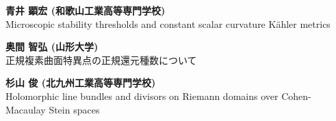 \documentclass[dvipdfmx,a4paper,12pt]{article}
\theoremstyle{plain} %
\theoremstyle{definition} %
\begin{document}
{\bf 青井 顕宏 (和歌山工業高等専門学校)}\\
Microscopic stability thresholds and constant scalar curvature Kähler metrics
\vskip5mm

\vskip1mm
{\bf 奥間 智弘 (山形大学)}\\
正規複素曲面特異点の正規還元種数について
\vskip3mm

{\bf 杉山 俊 (北九州工業高等専門学校)}\\
Holomorphic line bundles and divisors on Riemann domains over Cohen-Macaulay Stein spaces
\vskip5mm

\newpage 

\end{document}
